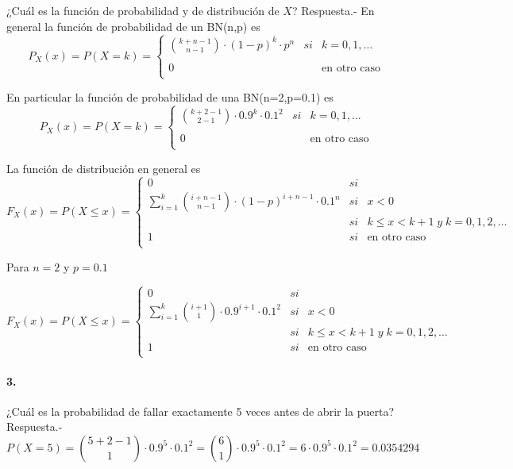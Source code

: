 \documentclass[
]{article}
\begin{document}
¿Cuál es la función de probabilidad y de distribución de \(X\)?
Respuesta.- En general la función de probabilidad de un BN(n,p) es
\[P_X(x) = P(X=k) = \left\{ \begin{array}{ll}
  {k+n-1 \choose n-1}\cdot (1-p)^k \cdot p^n&si&k=0,1,\ldots\\\\
  0&&\mbox{en otro caso}\\
  \end{array}\right.\]

En particular la función de probabilidad de una BN(n=2,p=0.1) es
\[P_X(x) = P(X=k) = \left\{ \begin{array}{ll}
  {k+2-1 \choose 2-1}\cdot 0.9^k \cdot 0.1^2&si&k=0,1,\ldots\\\\
  0&&\mbox{en otro caso}\\
  \end{array}\right.\]

La función de distribución en general es
\[F_X(x) = P(X\leq x) = \left\{\begin{array}{lcl}
    0&si&\\
    \sum\limits_{i=1}^k {i+n-1 \choose n-1}\cdot \left(1-p\right)^{i+n-1}\cdot 0.1^n&si&x<0\\
    &si&k\leq x < k+1 \; y \; k=0,1,2,\ldots\\
    1&si&\mbox{en otro caso}\\
  \end{array}\right.\]

Para \(n=2\) y \(p=0.1\)

\[F_X(x) = P(X\leq x) = \left\{\begin{array}{lcl}
    0&si&\\
    \sum\limits_{i=1}^k {i+1 \choose 1}\cdot 0.9^{i+1}\cdot 0.1^2&si&x<0\\
    &si&k\leq x < k+1 \; y \; k=0,1,2,\ldots\\
    1&si&\mbox{en otro caso}\\
  \end{array}\right.\]

\hypertarget{section-2}{%
\paragraph{3.}\label{section-2}}

¿Cuál es la probabilidad de fallar exactamente 5 veces antes de abrir la
puerta? Respuesta.-
\[P(X=5) = {5+2-1\choose 1}\cdot 0.9^5 \cdot 0.1^2 = {6\choose 1}\cdot 0.9^5 \cdot 0.1^2 = 6\cdot 0.9^5 \cdot 0.1^2 = 0.0354294\]
\end{document}
